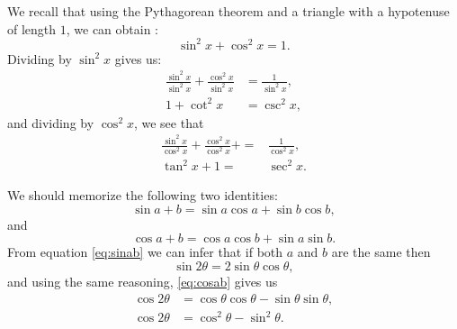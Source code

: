 We recall that using the Pythagorean theorem and a triangle with a hypotenuse of length $1$, we can obtain :
\begin{equation*}
	\sin^2x+\cos^2x=1.
\end{equation*}
Dividing by $\sin^2x$ gives us:
\begin{align*}
    \frac{\sin^2x}{\sin^2x}+\frac{\cos^2x}{\sin^2x} &= \frac{1}{\sin^2x}, \\
    1+\cot^2x &= \csc^2x,
\end{align*}
and dividing by $\cos^2x$, we see that
\begin{align}
    \frac{\sin^2x}{\cos^2x}+\frac{\cos^2x}{\cos^2x}+=&\frac{1}{\cos^2x}, \nonumber \\
    \tan^2x+1=&\sec^2x.
\end{align}

We should memorize the following two identities:
\begin{equation}
  \sin{a+b}=\sin a \cos a + \sin b \cos b,
  \label{eq:sinab}
\end{equation}
and
\begin{equation}
  \cos{a+b}=\cos a \cos b + \sin a \sin b.
  \label{eq:cosab}
\end{equation}
From equation \eqref{eq:sinab} we can infer that if both $a$ and $b$ are the same then
\begin{equation}
  \sin{2\theta}=2 \sin \theta \cos \theta,
  \label{eq:sin2q}
\end{equation}
and using the same reasoning, \eqref{eq:cosab} gives us
\begin{align}
  \cos{2\theta}&=\cos \theta \cos \theta- \sin\theta \sin\theta, \nonumber\\
  \cos{2\theta}&=\cos^2 \theta - \sin^2\theta.
  \label{eq:cos2q}
\end{align}

